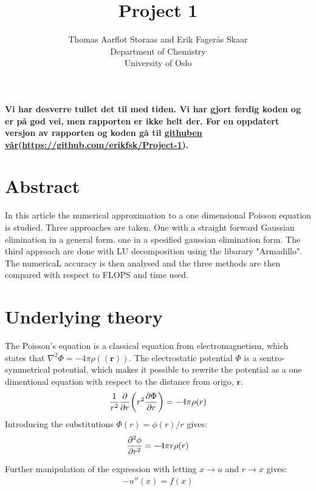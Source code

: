 \documentclass[12pt,norsk,a4paper]{article}
\begin{document}
\author{Thomas Aarflot Storaas and Erik Fagerås Skaar\\
	Department of Chemistry\\
	University of Oslo\\	
}

\title{Project 1}
\maketitle

\textbf{Vi har desverre tullet det til med tiden. Vi har gjort ferdig koden og er på god vei, men rapporten er ikke helt der. For en oppdatert versjon av rapporten og koden gå til \href{https://github.com/erikfsk/Project-1}{githuben vår}(\href{https://github.com/erikfsk/Project-1}{https://github.com/erikfsk/Project-1}).}

\section{Abstract}
In this article the numerical approximation to a one dimensional Poisson equation is studied. Three approaches are taken. One with a straight forward Gaussian elimination in a general form. one in a spesified gaussian elimination form. The third approach are done with LU decomposition using the libarary "Armadillo". The numericaL accuracy is then analysed and the three methods are then compared with respect to FLOPS and time used. %


\section{Underlying theory}

The Poisson's equation is a classical equation from electromagnetism, which states that $\nabla^2\Phi=-4\pi\rho(\mathbf{(r)})$. The electrostatic potential $\Phi$ is a sentro- symmetrical potential, which makes it possible to rewrite the potential as a one dimentional equation with respect to the distance from origo, $\mathbf{r}$.
\begin{align*}
	\frac{1}{r^2}\pdv{r}\qty(r^2 \pdv{\Phi}{r})=-4\pi\rho(r)
\end{align*}
Introducing the substitutions $\Phi(r)=\phi(r)/r$ gives:
\begin{align}
	\pdv[2]{\phi}{r}=-4\pi r \rho(r)
\end{align}

Further manipulation of the expression with letting $x\to  u$ and $r\to x$ gives:
\begin{align*}
	-u''(x)=f(x)
\end{align*}
\end{document}
